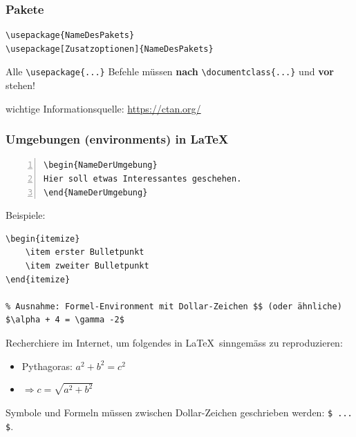\begin{frame}[fragile]
\frametitle{Pakete}
\begin{lstlisting}[style=LaTeX]
\usepackage{NameDesPakets}
\usepackage[Zusatzoptionen]{NameDesPakets}
\end{lstlisting}

Alle \lstinline[style=LaTeX]|\usepackage{...}| Befehle müssen \textbf{nach} \lstinline[style=LaTeX]|\documentclass{...}| und \textbf{vor} \lstinline[style=LaTeX]|| stehen!

\vspace{1cm}
wichtige Informationsquelle: \url{https://ctan.org/}
\end{frame}

\begin{frame}[fragile]
\frametitle{Umgebungen (environments) in \LaTeX}
\begin{lstlisting}[style=LaTeX,breaklines,numbers=left,tabsize=2]
\begin{NameDerUmgebung}
Hier soll etwas Interessantes geschehen.
\end{NameDerUmgebung}
\end{lstlisting}
Beispiele:
\begin{lstlisting}[style=LaTeX]
\begin{itemize}
	\item erster Bulletpunkt
	\item zweiter Bulletpunkt
\end{itemize}

% Ausnahme: Formel-Environment mit Dollar-Zeichen $$ (oder ähnliche)
$\alpha + 4 = \gamma -2$
\end{lstlisting}
\end{frame}


\begin{frame}[fragile]
\begin{myexercise}\label{myexercise:pythagoras}
    Recherchiere im Internet, um folgendes in \LaTeX\ sinngemäss zu reproduzieren:
    \begin{itemize}
        \item Pythagoras: $a^2 + b^2 = c^2$
        \item $\Rightarrow c = \sqrt{a^2 + b^2}$
    \end{itemize}
    Symbole und Formeln müssen zwischen Dollar-Zeichen geschrieben werden: \lstinline[style=LaTeX]|$ ... $|.
\end{myexercise}
\end{frame}

